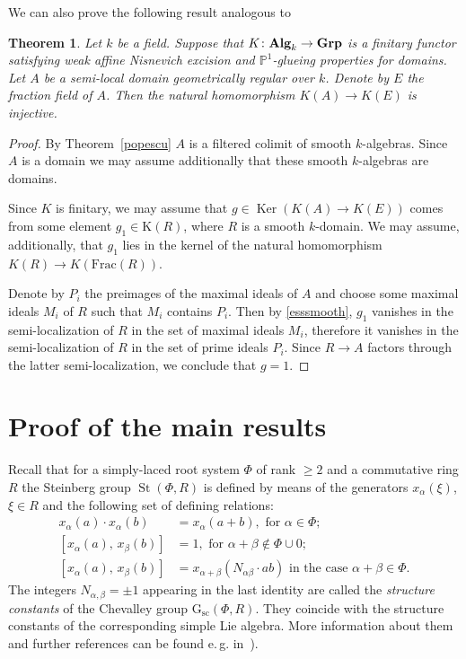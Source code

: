 \documentclass[oneside, 11pt]{amsart} \pdfoutput=1
\newcommand{\Ker}{\mathop{\mathrm{Ker}}\nolimits}
\newcommand{\St}{\mathop{\mathrm{St}}\nolimits}
\numberwithin{equation}{section}
\newtheorem{theorem}[lemma]{Theorem}
\theoremstyle{definition}
\newcommand{\catname}[1]{{\normalfont\textbf{#1}}} %
\begin{document}
We can also prove the following result analogous to~\cite[Theorem~1.2]{Sta20}
\begin{theorem}\label{thm:gb}
Let $k$ be a field.
Suppose that $K\colon\catname{Alg}_k\rightarrow\catname{Grp}$
is a finitary functor satisfying weak affine Nisnevich excision and $\mathbb{P}^1$-glueing properties for domains. 
Let $A$ be a semi-local domain geometrically regular over $k$. 
Denote by $E$ the fraction field of $A$.
Then the natural homomorphism $K(A) \to K(E)$ is injective.
\end{theorem}
\begin{proof}
By Theorem~\ref{popescu} $A$ is a filtered colimit of smooth $k$-algebras. Since $A$ is a domain we may assume additionally that these smooth $k$-algebras are domains.

Since $K$ is finitary, we may assume that $g \in \Ker(K(A) \to K(E))$ comes from some element $g_1\in\mathrm K(R)$, where $R$ is a smooth $k$-domain. We may assume, additionally, that $g_1$ lies in the kernel of the natural homomorphism $K(R) \to K(\mathrm{Frac}(R))$.

Denote by $P_i$ the preimages of the maximal ideals of $A$ and choose some maximal ideals $M_i$ of $R$ such that $M_i$ contains $P_i$. Then by \cref{esssmooth}, $g_1$ vanishes in the semi-localization of $R$ in the set of maximal ideals $M_i$, therefore it vanishes in the semi-localization of $R$ in the set of prime ideals $P_i$. Since $R\rightarrow A$ factors through the latter semi-localization, we conclude that $g=1$. 
\end{proof}

\section{Proof of the main results}
Recall that for a simply-laced root system $\Phi$ of rank $\geq 2$ and a commutative ring $R$ the Steinberg group $\St(\Phi, R)$ is defined by means of the generators $x_\alpha(\xi)$, $\xi \in R$ and the following set of defining relations:
\begin{align}
x_{\alpha}(a)\cdot x_{\alpha}(b)&=x_{\alpha}(a+b),\text{ for } \alpha\in \Phi;\tag{R1} \label{R1}\\
[x_{\alpha}(a),\,x_{\beta}(b)]  &=1,\text{ for }\alpha+\beta\not\in\Phi\cup 0; \tag{R2} \label{R2} \\
[x_{\alpha}(a),\,x_{\beta}(b)]  &=x_{\alpha+\beta}(N_{\alpha\beta} \cdot ab)\text{ in the case }\alpha+\beta\in\Phi. \tag{R3} \label{R3} \end{align}
The integers $N_{\alpha,\beta} = \pm 1$ appearing in the last identity are called the {\it structure constants} of the Chevalley group $\mathrm{G}_\mathrm{sc}(\Phi, R)$. They coincide with the structure constants of the corresponding simple Lie algebra. More information about them and further references can be found e.\,g. in~\cite[\S~2.4]{LSV20}).
\end{document}
